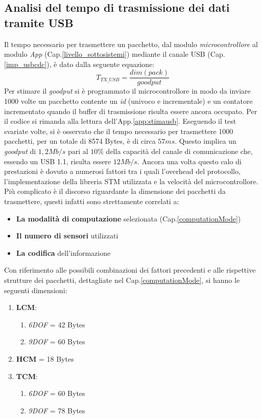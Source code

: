 \subsection{Analisi del tempo di trasmissione dei dati tramite USB}
\label{analisiusb}
Il tempo necessario per trasmettere un pacchetto, dal modulo \textit{microcontrollore} al modulo \textit{App} (Cap.\ref{livello_sottosistemi}) mediante il canale USB (Cap.\ref{imp_usbcdc}), è dato dalla seguente equazione:
\begin{equation}
\label{tx_usb}
T_{TX\_USB}=  \frac{dim(pack)}{goodput}
\end{equation}
Per stimare il \textit{goodput} si è programmato il microcontrollore in modo da inviare 1000 volte un pacchetto contente un \textit{id} (univoco e incrementale) e un contatore incrementato quando il buffer di trasmissione risulta essere ancora occupato. Per il codice si rimanda alla lettura dell'App.\ref{app:stimausb}.
Eseguendo il test svariate volte, si è osservato che il tempo necessario per trasmettere 1000 pacchetti, per un totale di 8574 Bytes, è di circa $57 ms$. 
Questo implica un \textit{goodput} di $1,2 Mb/s$ pari al $10\%$ della capacità del canale di comunicazione che, essendo un USB 1.1, risulta essere $12 Mb/s$. Ancora una volta questo calo di prestazioni è dovuto a numerosi fattori tra i quali l'overhead del protocollo, l'implementazione della libreria STM utilizzata e la velocità del microcontrollore.\\
Più complicato è il discorso riguardante la dimensione dei pacchetti da trasmettere, questi infatti sono strettamente correlati a:
 \begin{itemize}
 	\item \textbf{La modalità di computazione} selezionata (Cap.\ref{computationMode})
 	\item \textbf{Il numero di sensori} utilizzati
 	\item \textbf{La codifica} dell'informazione
  \end{itemize}

Con riferimento alle possibili combinazioni dei fattori precedenti e alle rispettive strutture dei pacchetti, dettagliate nel Cap.\ref{computationMode}, si hanno le seguenti dimensioni: 
\begin{enumerate}
	\item \textbf{LCM}:
		\begin{enumerate}
		\item \textit{6DOF} = 42 Bytes
		\item \textit{9DOF} = 60 Bytes
		\end{enumerate}
	\item \textbf{HCM} = 18 Bytes
	\item \textbf{TCM}:
			\begin{enumerate}
			\item \textit{6DOF} = 60 Bytes
			\item \textit{9DOF} = 78 Bytes
			\end{enumerate}
\end{enumerate}

